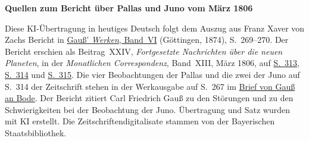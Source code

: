 \clearpage\thispagestyle{empty}
\begin{center}\textbf{Quellen zum Bericht über Pallas und Juno vom März 1806}\end{center}
\noindent Diese KI-Übertragung in heutiges Deutsch folgt dem Auszug aus Franz Xaver von Zachs Bericht in \href{https://gdz.sub.uni-goettingen.de/id/PPN236007467}{Gauß’ \textit{Werken}, Band~VI} (Göttingen, 1874), S.~269--270. Der Bericht erschien als Beitrag~XXIV, \textit{Fortgesetzte Nachrichten über die neuen Planeten}, in der \textit{Monatlichen Correspondenz}, Band~XIII, März 1806, auf \href{https://www.digitale-sammlungen.de/en/view/bsb10538605?page=323}{S.~313}, \href{https://www.digitale-sammlungen.de/en/view/bsb10538605?page=324}{S.~314} und \href{https://www.digitale-sammlungen.de/en/view/bsb10538605?page=325}{S.~315}. Die vier Beobachtungen der Pallas und die zwei der Juno auf S.~314 der Zeitschrift stehen in der Werkausgabe auf S.~267 im \hyperlink{native-272}{Brief von Gauß an Bode}. Der Bericht zitiert Carl Friedrich Gauß zu den Störungen und zu den Schwierigkeiten bei der Beobachtung der Juno. Übertragung und Satz wurden mit KI erstellt. Die Zeitschriftendigitalisate stammen von der Bayerischen Staatsbibliothek.
\clearpage
